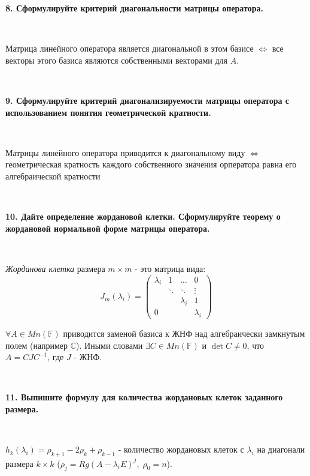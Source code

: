 \documentclass{article}
\begin{document}
	\textbf{8. Сформулируйте критерий диагональности матрицы оператора.}
	
	$\;$
	{
		\setlength{\parindent}{0.4cm}
		\hangindent=0.4cm	
		
		Матрица линейного оператора является диагональной в этом базисе $\Leftrightarrow$ все векторы этого базиса являются собственными векторами для $A$.
		
		$\;$
		\setlength{\parindent}{0cm}
		\hangindent=0cm
	}
	
	\textbf{9. Сформулируйте критерий диагонализируемости матрицы оператора с использованием понятия геометрической кратности.}
	
	$\;$
	{
		\setlength{\parindent}{0.4cm}
		\hangindent=0.4cm	
		
		Матрицы линейного оператора приводится к диагональному виду $\Leftrightarrow$ геометрическая кратность каждого собственного значения орператора равна его алгебраической кратности
		
		$\;$
		\setlength{\parindent}{0cm}
		\hangindent=0cm
	}
	
	\textbf{10. Дайте определение жордановой клетки. Сформулируйте теорему о жордановой нормальной форме матрицы оператора.}
	
	$\;$
	{
		\setlength{\parindent}{0.4cm}
		\hangindent=0.4cm	
		
		\textit{Жорданова клетка} размера $m \times m$ - это матрица вида: $$
		J_m(\lambda_i)=\begin{pmatrix}
		\lambda_i & 1 & \dots & 0 \\
		& \ddots & \ddots & \vdots \\
		&  & \lambda_{i} & 1 \\
		0&  &  & \lambda_i 
		\end{pmatrix}
		$$
		
		$\forall A \in Mn(\mathbb{F})$ приводится заменой базиса к ЖНФ над алгебраически замкнутым полем (например $\mathbb{C}$). Иными словами $\exists C \in Mn(\mathbb{F})$ и $\det C \not = 0$, что $A = C J C^{-1}$, где $J$ - ЖНФ.
		
		$\;$
		\setlength{\parindent}{0cm}
		\hangindent=0cm
	}
	
	\textbf{11. Выпишите формулу для количества жордановых клеток заданного размера.}
	
	$\;$
	{
		\setlength{\parindent}{0.4cm}
		\hangindent=0.4cm	
		
		$h_k(\lambda_i)=\rho_{k+1}-2\rho_{k}+\rho_{k-1}$  - количество жордановых клеток с $\lambda_i$ на диагонали размера $k\times k$ ($\rho_j = Rg(A-\lambda_i E)^j, \; \rho_0 = n$).
		
		$\;$
		\setlength{\parindent}{0cm}
		\hangindent=0cm
	}
	
\end{document}
